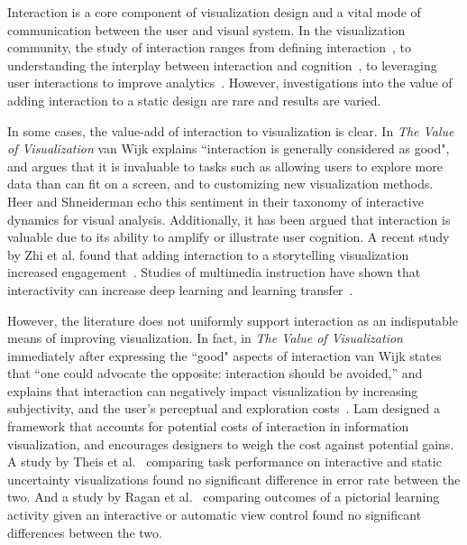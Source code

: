 

Interaction is a core component of visualization design and a vital mode of communication between the user and visual system. In the visualization community, the study of interaction ranges from defining interaction~\cite{dimara2020What, yi2007Toward, heer2012Interactive}, to understanding the interplay between interaction and cognition~\cite{liu2010Mental, pohl2012User}, to leveraging user interactions to improve analytics~\cite{brown2012Disfunction, endert2012Semantic}. However, investigations into the value of adding interaction to a static design are rare and results are varied.
 
In some cases, the value-add of interaction to visualization is clear. In \textit{The Value of Visualization} van Wijk explains ``interaction is generally considered as good", and argues that it is invaluable to tasks such as allowing users to explore more data than can fit on a screen, and to customizing new visualization methods\cite{wijk2005Value}. Heer and Shneiderman echo this sentiment in their taxonomy of interactive dynamics for visual analysis\cite{heer2012Interactive}. 
Additionally, it has been argued that interaction is valuable due to its ability to amplify or illustrate user cognition\cite{yi2007Toward, pohl2012User, liu2010Mental}. A recent study by Zhi et al. found that adding interaction to a storytelling visualization increased 
engagement~\cite{zhi2019linking}. Studies of multimedia instruction have shown that interactivity can increase deep learning and learning transfer~\cite{evans2007Interactivity, wang2011Impact}. 
      
However, the literature does not uniformly support interaction as an indisputable means of improving visualization. In fact, in \textit{The Value of Visualization} immediately after expressing the ``good" aspects of interaction van Wijk states that ``one could advocate the opposite: interaction should be avoided,'' and explains that interaction can negatively impact visualization by increasing subjectivity, and the user's perceptual and exploration costs~\cite{wijk2005Value}. Lam designed a framework that accounts for potential costs of interaction in information visualization, and encourages designers to weigh the cost against potential gains\cite{lam2008Framework}. A study by Theis et al.~\cite{theis2016Ergonomic} comparing task performance on interactive and static uncertainty visualizations found no significant difference in error rate between the two. And a study by Ragan et al.~\cite{ragan2012Spatial} comparing outcomes of a pictorial learning activity given an interactive or automatic view control found no significant differences between the two.       

